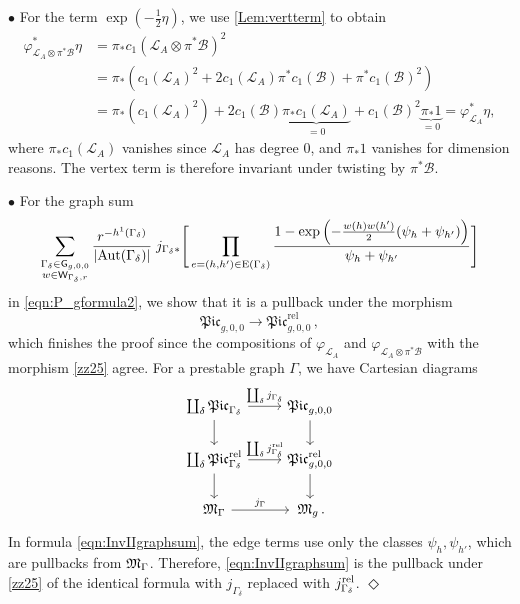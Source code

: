 \documentclass[a4paper,12pt]{article} %
\newcommand{\ca}[1]{{\mathcal{#1}}}
\def\qed{{\hfill $\Diamond$}}
\def\Aut{{\rm Aut}}
\def\E{\mathrm{E}}
\def\V{\mathrm{V}}
\def\G{\mathsf{G}}
\theoremstyle{definition}
\theoremstyle{plain}%
\renewcommand{\phi}{\varphi}
\newcommand{\Picabs}{\mathfrak{Pic}}
\newcommand{\Picrel}{\mathfrak{Pic}^{\mathrm{rel}}}
\begin{document}
\noindent $\bullet$ For the term $\exp\left(-\frac12 \eta \right)$,  we use \cref{Lem:vertterm} to obtain
\begin{align*}
\phi_{\ca L_A \otimes \pi^* \ca B}^* \eta &= \pi_* c_1( \mathcal{L}_{A} \otimes \pi^* \ca B)^2\\ &= \pi_* \left(c_1( \mathcal{L}_{A})^2 + 2 c_1(\mathcal{L}_{A}) \pi^* c_1(\ca B) + \pi^* c_1(\ca B)^2\right) \\
&= \pi_* \left(c_1( \mathcal{L}_{A})^2\right) + 2 c_1(\ca B) \underbrace{\pi_* c_1(\mathcal{L}_{A})}_{=0}  +  c_1(\ca B)^2 \underbrace{\pi_* 1}_{=0} = \phi_{\ca L_A}^* \eta,
\end{align*}
where 
$\pi_* c_1(\mathcal{L}_{A})$
vanishes since $\mathcal{L}_{A}$ has degree $0$, and $\pi_*1$ vanishes for dimension reasons. The vertex term is therefore
invariant under twisting by $\pi^* \ca B$.

\noindent $\bullet$ For the graph sum 
\begin{equation} \label{eqn:InvIIgraphsum}
\sum_{
\substack{\Gamma_\delta\in \G_{g,0,0} \\
w\in \mathsf{W}_{\Gamma_\delta,r}}
}
\frac{r^{-h^1(\Gamma_\delta)}}{|\Aut(\Gamma_\delta)| }
\;
j_{\Gamma_\delta*}\Bigg[
\prod_{e=(h,h')\in \E(\Gamma_\delta)}
\frac{1-\exp\left(-\frac{w(h)w(h')}2(\psi_h+\psi_{h'})\right)}{\psi_h + \psi_{h'}} \Bigg]    
\end{equation}
in \eqref{eqn:P_gformula2}, we show that it is a pullback under the morphism 
\begin{equation}\label{zz25}
\Picabs_{g,0,0} \to \Picrel_{g,0,0}\, ,
\end{equation}
which finishes the proof since the compositions of $\phi_{\ca L_A}$ and $\phi_{\ca L_A \otimes \pi^* \ca B}$ with the morphism
\eqref{zz25} agree. For a prestable graph $\Gamma$,
we have Cartesian diagrams
\begin{equation}
\begin{tikzcd}
\coprod_\delta \Picabs_{\Gamma_\delta} \arrow[r,"\coprod_\delta j_{\Gamma_\delta}"] \arrow[d] & \Picabs_{g,0,0} \arrow[d]\\
\coprod_\delta \Picrel_{\Gamma_\delta} \arrow[r,"\coprod_\delta j^\textup{rel}_{\Gamma_\delta}"] \arrow[d] & \Picrel_{g,0,0} \arrow[d]\\
\frak M_\Gamma \arrow[r,"j_{\Gamma}"] & \, \frak M_g\, .
\end{tikzcd}
\end{equation}
In formula  \eqref{eqn:InvIIgraphsum}, the edge terms use only the classes $\psi_h, \psi_{h'}$, which are pullbacks from $\frak M_\Gamma$. Therefore, \eqref{eqn:InvIIgraphsum} is the pullback under \eqref{zz25} of the identical formula with $j_{\Gamma_\delta}$ replaced with $j^\textup{rel}_{\Gamma_\delta}$. \qed
\end{document}
